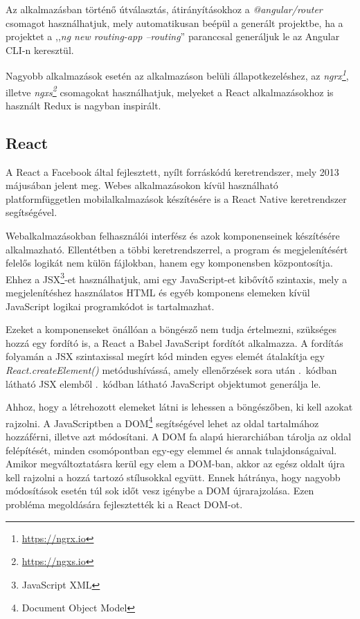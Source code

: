 \documentclass[
]{thesis-ekf}
\theoremstyle{definition}
\theoremstyle{remark}
\begin{document}
	Az alkalmazásban történő útválasztás, átirányításokhoz a \emph{@angular/router} csomagot használhatjuk, mely automatikusan beépül a generált projektbe, ha a projektet a ,,\emph{ng new routing-app --routing}'' paranccsal generáljuk le az Angular CLI-n keresztül.
	
	Nagyobb alkalmazások esetén az alkalmazáson belüli állapotkezeléshez, az \emph{ngrx\footnote{\url{https://ngrx.io}}}, illetve \emph{ngxs\footnote{\url{https://ngxs.io}}} csomagokat használhatjuk, melyeket a React alkalmazásokhoz is használt Redux is nagyban inspirált.
	
	\subsection[React]{React\cite{vuecomparison}\cite{react}}\label{subs:react}
	A React a Facebook által fejlesztett, nyílt forráskódú keretrendszer, mely 2013 májusában jelent meg. Webes alkalmazásokon kívül használható platformfüggetlen mobilalkalmazások készítésére is a React Native keretrendszer segítségével.
	
	Webalkalmazásokban felhasználói interfész és azok komponenseinek készítésére alkalmazható. Ellentétben a többi keretrendszerrel, a program és megjelenítésért felelős logikát nem külön fájlokban, hanem egy komponensben központosítja. Ehhez a JSX\footnote{JavaScript XML}-et használhatjuk, ami egy JavaScript-et kibővítő szintaxis, mely a megjelenítéshez használatos HTML és egyéb komponens elemeken kívül JavaScript logikai programkódot is tartalmazhat.
	
	
	
	Ezeket a komponenseket önállóan a böngésző nem tudja értelmezni, szükséges hozzá egy fordító is, a React a Babel JavaScript fordítót alkalmazza. A fordítás folyamán a JSX szintaxissal megírt kód minden egyes elemét átalakítja egy \emph{React.createElement()} metódushívássá, amely ellenőrzések sora után \az{\ref{kod-jsx-elem}}.~kódban látható JSX elemből \az{\ref{kod-jsx-object}}.~kódban látható JavaScript objektumot generálja le.
	
	
	
	Ahhoz, hogy a létrehozott elemeket látni is lehessen a böngészőben, ki kell azokat rajzolni. A JavaScriptben a DOM\footnote{Document Object Model} segítségével lehet az oldal tartalmához hozzáférni, illetve azt módosítani. A DOM fa alapú hierarchiában tárolja az oldal felépítését, minden csomópontban egy-egy elemmel és annak tulajdonságaival. Amikor megváltoztatásra kerül egy elem a DOM-ban, akkor az egész oldalt újra kell rajzolni a hozzá tartozó stílusokkal együtt. Ennek hátránya, hogy nagyobb módosítások esetén túl sok időt vesz igénybe a DOM újrarajzolása. Ezen probléma megoldására fejlesztették ki a React DOM-ot.
	
\end{document}
